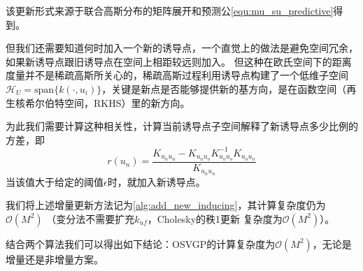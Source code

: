 该更新形式来源于联合高斯分布的矩阵展开和预测公\autoref{equ:mu_su_predictive}得到。

但我们还需要知道何时加入一个新的诱导点，一个直觉上的做法是避免空间冗余，如果新诱导点跟旧诱导点在空间上相距较远则加入。
但这种在欧氏空间下的距离度量并不是稀疏高斯所关心的，稀疏高斯过程利用诱导点构建了一个低维子空间$\mathcal H_U = \text{span}
\{ k(\cdot, u_i) \}$，关键是新点是否能够提供新的基方向，是在函数空间（再生核希尔伯特空间，RKHS）里的新方向。

为此我们需要计算这种相关性，计算当前诱导点子空间解释了新诱导点多少比例的方差，即
\begin{equation}
    r(u_n) = \frac{K_{u_n u_n} - K_{u_n u_o} K_{u_o u_o}^{-1} K_{u_o u_n}}{K_{u_n u_n}}
\end{equation}
当该值大于给定的阈值$\epsilon$时，就加入新诱导点。

我们将上述增量更新方法记为\autoref{alg:add_new_inducing}，其计算复杂度仍为$\mathcal O(M^2)$ （变分法不需要扩充$k_{u f}$，Cholesky的秩1更新
复杂度为$\mathcal O(M^2)$）。

结合两个算法我们可以得出如下结论：OSVGP的计算复杂度为$\mathcal O(M^2)$，无论是增量还是非增量方案。

